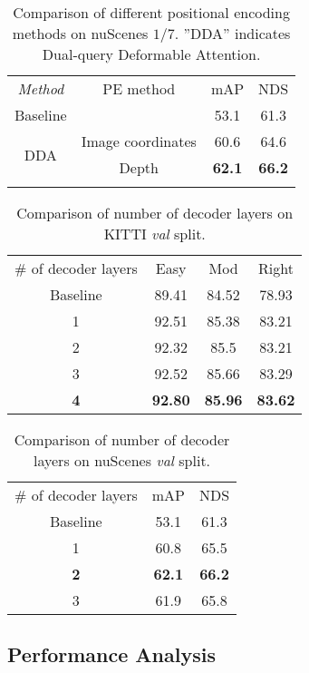 \documentclass[lettersize,journal]{IEEEtran}
\begin{document}
 
\begin{table}[t]
\renewcommand{\arraystretch}{1.0}
\centering
\caption{Comparison of different positional encoding methods on nuScenes $1/7$. ”DDA” indicates Dual-query Deformable Attention.}
\begin{tabular}{cccc}
\cline{1-4}
\textit{Method}    & PE method      & mAP  & NDS  \\
\cline{1-4}
Baseline\cite{centerpoint}& & 53.1 & 61.3 \\
\cline{1-4}
\multirow{2}{*}{DDA}  
         & Image coordinates    & 60.6 & 64.6 \\
& Depth        & \textbf{62.1} & \textbf{66.2} \\
\cline{1-4}
\label{table:abl_pe}
\end{tabular}
\vspace{-0.5cm}
\end{table} \begin{table}[t]
\renewcommand{\arraystretch}{1.0}
\centering
\caption{Comparison of number of decoder layers on KITTI \textit{val} split.}

    \centering
    \begin{tabular}{cccc}
    \cline{1-4}
    \# of decoder layers & Easy  & Mod   & Right \\ 
    \cline{1-4}
    Baseline\cite{voxelrcnn}       & 89.41 & 84.52 & 78.93 \\
    \cline{1-4}
    1                    & 92.51 & 85.38 & 83.21 \\
    2                    & 92.32 & 85.5  & 83.21 \\
    3                    & 92.52 & 85.66 & 83.29 \\
    \textbf{4}                    & \textbf{92.80} & \textbf{85.96} & \textbf{83.62} \\
    \cline{1-4}
    \end{tabular}
\label{table:abl_num_encoder_layer_kitti}
\vspace{-0.2cm}
\end{table} \begin{table}[htb!]
\renewcommand{\arraystretch}{1.0}
\centering
\caption{Comparison of number of decoder layers on nuScenes \textit{val} split.}

    \centering
    \begin{tabular}{ccc}
    \cline{1-3}
    \# of decoder layers & mAP  & NDS   \\
    \cline{1-3}
    Baseline\cite{centerpoint}       & 53.1 & 61.3 \\
    \cline{1-3}
    1                    & 60.8 & 65.5 \\
    \textbf{2}                    & \textbf{62.1} & \textbf{66.2} \\
    3                    & 61.9 & 65.8 \\
    \cline{1-3}
    \end{tabular}


\label{table:abl_num_encoder_layer_nus}
\end{table} \subsection{Performance Analysis}
\end{document}
